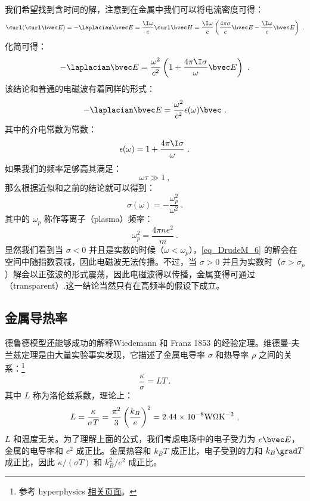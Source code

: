 我们希望找到含时间的解，注意到在金属中我们可以将电流密度可得：
\begin{equation}
\curl(\curl\bvec E)=-\laplacian \bvec E =\frac{\I\omega}{c}\curl\bvec H=\frac{\I\omega}{c}\left(\frac{4\pi\sigma}{c}\bvec E-\frac{\I\omega}{c}\bvec E\right)~.
\end{equation}
化简可得：
\begin{equation}
-\laplacian \bvec E =\frac{\omega^2}{c^2}\left(1+\frac{4\pi\I\sigma}{\omega}\bvec E\right)~.
\end{equation}
该结论和普通的电磁波有着同样的形式：
\begin{equation}\label{eq_DrudeM_6}
-\laplacian \bvec E = \frac{\omega^2}{c^2}\epsilon(\omega)\bvec ~.
\end{equation}
其中的介电常数为常数：
\begin{equation}
\epsilon(\omega)=1+\frac{4\pi\I\sigma}{\omega}~.
\end{equation}
如果我们的频率足够高其满足：
\begin{equation}
\omega\tau\gg 1~,
\end{equation}
那么根据近似和之前的结论就可以得到：
\begin{equation}
\sigma(\omega)=-\frac{\omega_p^2}{\omega^2}~.
\end{equation}
其中的 $\omega_p$ 称作等离子（plasma）频率：
\begin{equation}
\omega_p^2=\frac{4\pi ne^2}{m}~.
\end{equation}
显然我们看到当 $\sigma<0$ 并且是实数的时候（$\omega<\omega_p$），\autoref{eq_DrudeM_6} 的解会在空间中随指数衰减，因此电磁波无法传播。不过，当 $\sigma>0$ 并且为实数时（$\sigma>\sigma_p$）解会以正弦波的形式震荡，因此电磁波得以传播，金属变得可通过（transparent）.这一结论当然只有在高频率的假设下成立。

\subsection{金属导热率}
德鲁德模型还能够成功的解释Wiedemann 和 Franz 1853 的经验定理。维德曼-夫兰兹定理是由大量实验事实发现，它描述了金属电导率 $\sigma$ 和热导率 $\rho$ 之间的关系：\footnote{参考 hyperphysics \href{http://hyperphysics.phy-astr.gsu.edu/hbase/thermo/thercond.html}{相关页面}。}
\begin{equation}
\frac{\kappa}{\sigma}=LT~.
\end{equation}
其中 $L$ 称为洛伦兹系数，理论上：
\begin{equation}\label{eq_DrudeM_47}
L=\frac{\kappa}{\sigma T}=\frac{\pi^2}{3}\left(\frac{k_B}{e}\right)^2 = 2.44\times10^{-8}\rm{W\Omega K^{-2}}~,
\end{equation}
$L$ 和温度无关。为了理解上面的公式，我们考虑电场中的电子受力为 $e\bvec E$，金属的电导率和 $e^2$ 成正比。金属热容和 $k_B T$ 成正比，电子受到的力和 $k_B\grad T$ 成正比，因此 $\kappa/(\sigma T)$ 和 $k_B^2/e^2$ 成正比。

